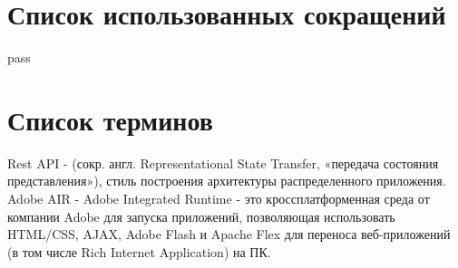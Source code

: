 \newpage
\section{Список использованных сокращений}
pass
\section{Список терминов}
Rest API - (сокр. англ. Representational State Transfer, «передача состояния представления»), стиль построения архитектуры распределенного приложения.\\

Adobe AIR - Adobe Integrated Runtime - это кроссплатформенная среда от компании Adobe для запуска приложений, позволяющая использовать HTML/CSS, AJAX, Adobe Flash и Apache Flex для переноса веб-приложений (в том числе Rich Internet Application) на ПК.
